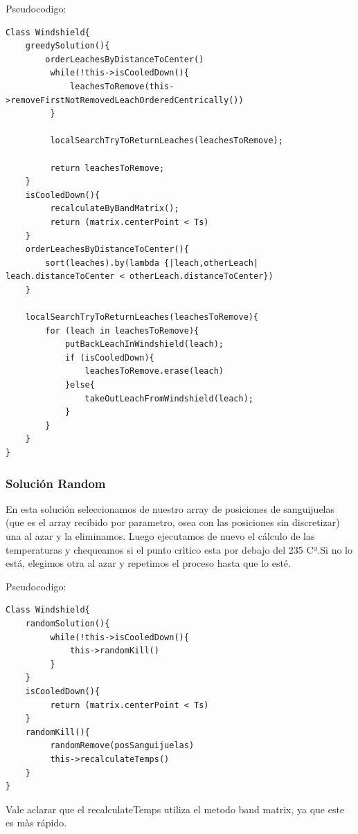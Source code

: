 \newpage
Pseudocodigo:

\begin{verbatim}
Class Windshield{
    greedySolution(){
        orderLeachesByDistanceToCenter()
         while(!this->isCooledDown(){
             leachesToRemove(this->removeFirstNotRemovedLeachOrderedCentrically())
         }

         localSearchTryToReturnLeaches(leachesToRemove);

         return leachesToRemove;
    } 
    isCooledDown(){
         recalculateByBandMatrix();
         return (matrix.centerPoint < Ts)
    }
    orderLeachesByDistanceToCenter(){
        sort(leaches).by(lambda {|leach,otherLeach| leach.distanceToCenter < otherLeach.distanceToCenter})
    }

    localSearchTryToReturnLeaches(leachesToRemove){
        for (leach in leachesToRemove){
            putBackLeachInWindshield(leach);
            if (isCooledDown){
                leachesToRemove.erase(leach)
            }else{
                takeOutLeachFromWindshield(leach);
            }
        }
    }
}
\end{verbatim}



\subsubsection{Solución Random}\label{sec:solucionRandom}


En esta solución seleccionamos de nuestro array de posiciones de sanguijuelas (que es el array recibido por parametro, osea con las posiciones sin discretizar) una al azar y la eliminamos. Luego ejecutamos de nuevo el cálculo de las temperaturas y chequeamos si el punto crìtico esta por debajo del 235 Cº.Si no lo está, elegimos otra al azar y repetimos el proceso hasta que lo esté. 

Pseudocodigo:

\begin{verbatim}
Class Windshield{
    randomSolution(){
         while(!this->isCooledDown(){
             this->randomKill()
         }
    } 
    isCooledDown(){
         return (matrix.centerPoint < Ts)
    }
    randomKill(){
         randomRemove(posSanguijuelas)
         this->recalculateTemps()
    }
}
\end{verbatim}

Vale aclarar que el recalculateTemps utiliza el metodo band matrix, ya que este es màs rápido.









